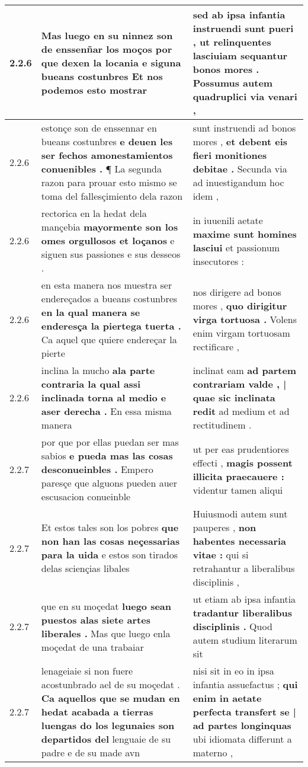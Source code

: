 \begin{tabular}{|p{1cm}|p{6.5cm}|p{6.5cm}|}
2.2.6 & Mas luego en su ninnez son de enssenñar los moços \textbf{ por que dexen la locania e siguna bueans costunbres } Et nos podemos esto mostrar & sed ab ipsa infantia instruendi sunt pueri , \textbf{ ut relinquentes lasciuiam sequantur bonos mores . } Possumus autem quadruplici via venari , \\\hline
2.2.6 & estonçe son de enssennar en bueans costunbres \textbf{ e deuen les ser fechos amonestamientos conuenibles . } ¶ La segunda razon para prouar esto mismo se toma del fallesçimiento dela razon & sunt instruendi ad bonos mores , \textbf{ et debent eis fieri monitiones debitae . } Secunda via ad inuestigandum hoc idem , \\\hline
2.2.6 & rectorica en la hedat dela mançebia \textbf{ mayormente son los omes orgullosos et loçanos } e siguen sus passiones e sus desseos . & in iuuenili aetate \textbf{ maxime sunt homines lasciui } et passionum insecutores : \\\hline
2.2.6 & en esta manera nos muestra ser endereçados a bueans costunbres \textbf{ en la qual manera se enderesça la piertega tuerta . } Ca aquel que quiere endereçar la pierte & nos dirigere ad bonos mores , \textbf{ quo dirigitur virga tortuosa . } Volens enim virgam tortuosam rectificare , \\\hline
2.2.6 & inclina la mucho \textbf{ ala parte contraria la qual assi inclinada torna al medio e aser derecha . } En essa misma manera & inclinat eam \textbf{ ad partem contrariam valde , | quae sic inclinata redit } ad medium et ad rectitudinem . \\\hline
2.2.7 & por que por ellas puedan ser mas sabios \textbf{ e pueda mas las cosas desconueinbles . } Empero paresçe que alguons pueden auer escusacion conueinble & ut per eas prudentiores effecti , \textbf{ magis possent illicita praecauere : } videntur tamen aliqui \\\hline
2.2.7 & Et estos tales son los pobres \textbf{ que non han las cosas neçessarias para la uida } e estos son tirados delas sciençias libales & Huiusmodi autem sunt pauperes , \textbf{ non habentes necessaria vitae : } qui si retrahantur a liberalibus disciplinis , \\\hline
2.2.7 & que en su moçedat \textbf{ luego sean puestos alas siete artes liberales . } Mas que luego enla moçedat de una trabaiar & ut etiam ab ipsa infantia \textbf{ tradantur liberalibus disciplinis . } Quod autem studium literarum sit \\\hline
2.2.7 & lenageiaie si non fuere acostunbrado ael de su moçedat . \textbf{ Ca aquellos que se mudan en hedat acabada a tierras luengas do los legunaies son departidos del } lenguaie de su padre e de su made avn & nisi sit in eo in ipsa infantia assuefactus ; \textbf{ qui enim in aetate perfecta transfert se | ad partes longinquas } ubi idiomata differunt a materno , \\\hline

\end{tabular}
